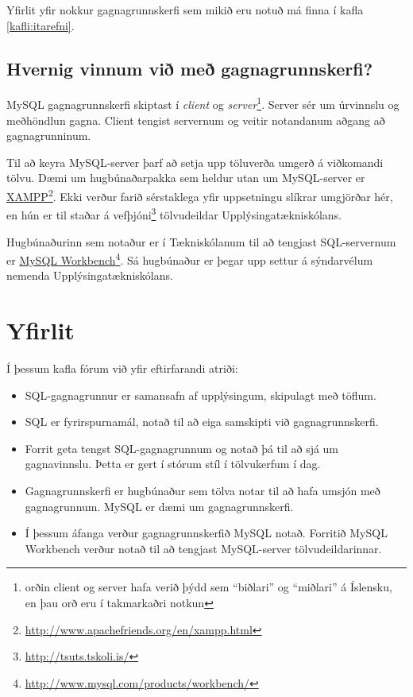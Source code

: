 Yfirlit yfir nokkur gagnagrunnskerfi sem mikið eru notuð má finna í kafla \ref{kafli:itarefni}.
\subsection{Hvernig vinnum við með gagnagrunnskerfi?}
MySQL gagnagrunnskerfi skiptast í \emph{client} og \emph{server}\footnote{orðin client og server hafa verið þýdd sem ``biðlari'' og ``miðlari'' á Íslensku, en þau orð eru í takmarkaðri notkun}. Server sér um úrvinnslu og meðhöndlun gagna. Client tengist servernum og veitir notandanum aðgang að gagnagrunninum.

Til að keyra MySQL-server þarf að setja upp töluverða umgerð á viðkomandi tölvu. Dæmi um hugbúnaðarpakka sem heldur utan um MySQL-server er \href{http://www.apachefriends.org/en/xampp.html}{XAMPP}\footnote{\url{http://www.apachefriends.org/en/xampp.html}}. Ekki verður farið sérstaklega yfir uppsetningu slíkrar umgjörðar hér, en hún er til staðar á vefþjóni\footnote{\url{http://tsuts.tskoli.is/}} tölvudeildar Upplýsingatækniskólans.

Hugbúnaðurinn sem notaður er í Tækniskólanum til að tengjast SQL-servernum er \href{http://www.mysql.com/products/workbench/}{MySQL Workbench}\footnote{\url{http://www.mysql.com/products/workbench/}}. Sá hugbúnaður er þegar upp settur á sýndarvélum nemenda Upplýsingatækniskólans.
\section{Yfirlit}
Í þessum kafla fórum við yfir eftirfarandi atriði:
\begin{itemize}
 \item SQL-gagnagrunnur er samansafn af upplýsingum, skipulagt með töflum.
 \item SQL er fyrirspurnamál, notað til að eiga samskipti við gagnagrunnskerfi.
 \item Forrit geta tengst SQL-gagnagrunnum og notað þá til að sjá um gagnavinnslu. Þetta er gert í stórum stíl í tölvukerfum í dag.
 \item Gagnagrunnskerfi er hugbúnaður sem tölva notar til að hafa umsjón með gagnagrunnum. MySQL er dæmi um gagnagrunnskerfi.
 \item Í þessum áfanga verður gagnagrunnskerfið MySQL notað. Forritið MySQL Workbench verður notað til að tengjast MySQL-server tölvudeildarinnar.
\end{itemize}